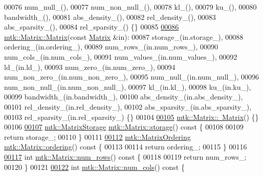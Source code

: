 \begin{DoxyCode}
00076   num\_null\_(),
00077   num\_non\_null\_(),
00078   kl\_(),
00079   ku\_(),
00080   bandwidth\_(),
00081   abs\_density\_(),
00082   rel\_density\_(),
00083   abs\_sparsity\_(),
00084   rel\_sparsity\_() \{\}
00085 
\hypertarget{mtk__matrix_8cc_source_l00086}{}\hyperlink{classmtk_1_1Matrix_ae532878cf9b34114f12a1f06701482aa}{00086} \hyperlink{classmtk_1_1Matrix_a04b8575764d3a649f21950c794f4cc02}{mtk::Matrix::Matrix}(\textcolor{keyword}{const} \hyperlink{classmtk_1_1Matrix}{Matrix} &in):
00087   storage\_(in.storage\_),
00088   ordering\_(in.ordering\_),
00089   num\_rows\_(in.num\_rows\_),
00090   num\_cols\_(in.num\_cols\_),
00091   num\_values\_(in.num\_values\_),
00092   ld\_(in.ld\_),
00093   num\_zero\_(in.num\_zero\_),
00094   num\_non\_zero\_(in.num\_non\_zero\_),
00095   num\_null\_(in.num\_null\_),
00096   num\_non\_null\_(in.num\_non\_null\_),
00097   kl\_(in.kl\_),
00098   ku\_(in.ku\_),
00099   bandwidth\_(in.bandwidth\_),
00100   abs\_density\_(in.abs\_density\_),
00101   rel\_density\_(in.rel\_density\_),
00102   abs\_sparsity\_(in.abs\_sparsity\_),
00103   rel\_sparsity\_(in.rel\_sparsity\_) \{\}
00104 
\hypertarget{mtk__matrix_8cc_source_l00105}{}\hyperlink{classmtk_1_1Matrix_a7dcc92fcf67904eaf17bb7b9d809f274}{00105} \hyperlink{classmtk_1_1Matrix_a7dcc92fcf67904eaf17bb7b9d809f274}{mtk::Matrix::~Matrix}() \{\}
00106 
\hypertarget{mtk__matrix_8cc_source_l00107}{}\hyperlink{classmtk_1_1Matrix_a21893fc643eebadd9757c8995cf44dd3}{00107} \hyperlink{group__c02-enums_ga25b67ec6a2afeee69f9bb196a9c66619}{mtk::MatrixStorage} \hyperlink{classmtk_1_1Matrix_a21893fc643eebadd9757c8995cf44dd3}{mtk::Matrix::storage}()\textcolor{keyword}{ const }\{
00108 
00109   \textcolor{keywordflow}{return} storage\_;
00110 \}
00111 
\hypertarget{mtk__matrix_8cc_source_l00112}{}\hyperlink{classmtk_1_1Matrix_af675e480c7b94f194aadad316e53b002}{00112} \hyperlink{group__c02-enums_ga622801bd9f912d0f976c3e383f5f581c}{mtk::MatrixOrdering} \hyperlink{classmtk_1_1Matrix_af675e480c7b94f194aadad316e53b002}{mtk::Matrix::ordering}()\textcolor{keyword}{ const }\{
00113 
00114   \textcolor{keywordflow}{return} ordering\_;
00115 \}
00116 
\hypertarget{mtk__matrix_8cc_source_l00117}{}\hyperlink{classmtk_1_1Matrix_a69feb30fc0018faee65fe9f7cb43e0ed}{00117} \textcolor{keywordtype}{int} \hyperlink{classmtk_1_1Matrix_a69feb30fc0018faee65fe9f7cb43e0ed}{mtk::Matrix::num\_rows}()\textcolor{keyword}{ const }\{
00118 
00119   \textcolor{keywordflow}{return} num\_rows\_;
00120 \}
00121 
\hypertarget{mtk__matrix_8cc_source_l00122}{}\hyperlink{classmtk_1_1Matrix_a1e52243fa290de6ee4bcc48cd1776a9a}{00122} \textcolor{keywordtype}{int} \hyperlink{classmtk_1_1Matrix_a1e52243fa290de6ee4bcc48cd1776a9a}{mtk::Matrix::num\_cols}()\textcolor{keyword}{ const }\{

\end{DoxyCode}
